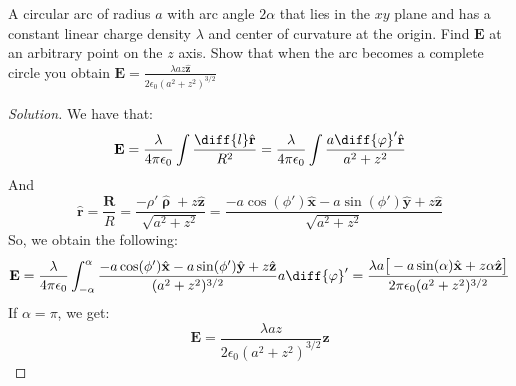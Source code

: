 \documentclass[crop=false,class=article,oneside]{standalone}
\begin{document}
        \begin{problem}[Wangsness 3-10]
            A circular arc of radius $a$ with arc angle $2\alpha$
            that lies in the $xy$ plane and has a constant linear
            charge density $\lambda$ and center of curvature at
            the origin. Find $\mathbf{E}$ at an arbitrary point
            on the $z$ axis. Show that when the arc becomes a
            complete circle you obtain
            $\mathbf{E}%
             =\frac{\lambda{az}\hat{\mathbf{z}}}%
                   {2\epsilon_{0}(a^{2}+z^{2})^{3/2}}$
        \end{problem}
        \begin{proof}[Solution]
            We have that:
            \begin{equation*}
                \mathbf{E}
                =\frac{\lambda}{4\pi\epsilon_{0}}
                \int\frac{\diff{l}\hat{\mathbf{r}}}{R^{2}}
                =\frac{\lambda}{4\pi\epsilon_0}
                \int\frac{a\diff{\varphi}'\hat{\mathbf{r}}}
                         {a^{2}+z^{2}}
            \end{equation*}
            And
            \begin{equation*}
                \hat{\mathbf{r}}=\frac{\mathbf{R}}{R}
                =\frac{-\rho'\hat{\boldsymbol{\uprho}}
                +z\hat{\mathbf{z}}}{\sqrt{a^{2}+z^{2}}}
                =\frac{-a\cos(\phi')\hat{\mathbf{x}}
                -a\sin(\phi')\hat{\mathbf{y}}
                +z\hat{\mathbf{z}}}{\sqrt{a^{2}+z^{2}}}    
            \end{equation*}
            So, we obtain the following:
            \begin{equation*}
                \mathbf{E}
                =\frac{\lambda}{4\pi\epsilon_0}
                \int_{-\alpha}^{\alpha}
                \frac{-a\cos(\phi')\hat{\mathbf{x}}
                      -a\sin(\phi')\hat{\mathbf{y}}
                      +z\hat{\mathbf{z}}}
                     {(a^{2}+z^{2})^{3/2}}a\diff{\varphi}'
                =\frac{\lambda{a}\big[
                           -a\sin(\alpha)\hat{\mathbf{x}}
                           +z\alpha\hat{\mathbf{z}}
                       \big]}
                      {2\pi\epsilon_{0}(a^{2}+z^{2})^{3/2}}
            \end{equation*}
            If $\alpha=\pi$, we get:
            \begin{equation*}
                \mathbf{E}
                =\frac{\lambda az}
                      {2\epsilon_{0}(a^{2}+z^{2})^{3/2}}
                \hat{\mathbf{z}}
            \end{equation*}
        \end{proof}
\end{document}
